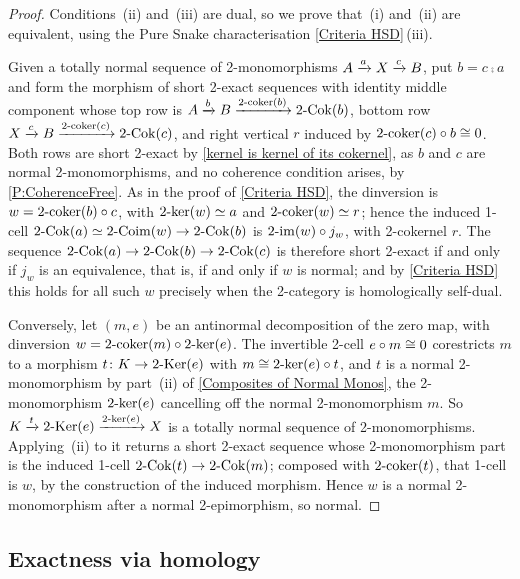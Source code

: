 \begin{proof}
  \leanok
  Conditions~(ii) and~(iii) are dual, so we prove that~(i) and~(ii) are equivalent, using the Pure Snake characterisation \prox\ref{Criteria HSD}\,\textup{(iii)}.

	Given a totally normal sequence of 2-monomorphisms \(A\xrightarrow[]{a}X\xrightarrow[]{c}B\), put \(b=c\comp a\) and form the morphism of short 2-exact sequences with identity middle component whose top row is \(A\xrightarrow[]{b}B\xrightarrow[]{2\text{-}\mathrm{coker}(b)}2\text{-}\mathrm{Cok}(b)\), bottom row \(X\xrightarrow[]{c}B\xrightarrow[]{2\text{-}\mathrm{coker}(c)}2\text{-}\mathrm{Cok}(c)\), and right vertical \(r\) induced by \(2\text{-}\mathrm{coker}(c)\circ b\cong 0\). Both rows are short 2-exact by \prox\ref{kernel is kernel of its cokernel}, as \(b\) and \(c\) are normal 2-monomorphisms, and no coherence condition arises, by \prox\ref{P:CoherenceFree}. As in the proof of \prox\ref{Criteria HSD}, the dinversion is \(w=2\text{-}\mathrm{coker}(b)\circ c\), with \(2\text{-}\mathrm{ker}(w)\simeq a\) and \(2\text{-}\mathrm{coker}(w)\simeq r\); hence the induced 1-cell \(2\text{-}\mathrm{Cok}(a)\simeq2\text{-}\mathrm{Coim}(w)\to2\text{-}\mathrm{Cok}(b)\) is \(2\text{-}\mathrm{im}(w)\circ j_w\), with 2-cokernel \(r\). The sequence \(2\text{-}\mathrm{Cok}(a)\to2\text{-}\mathrm{Cok}(b)\to2\text{-}\mathrm{Cok}(c)\) is therefore short 2-exact if and only if \(j_w\) is an equivalence, that is, if and only if \(w\) is normal; and by \prox\ref{Criteria HSD} this holds for all such \(w\) precisely when the 2-category is homologically self-dual.

	Conversely, let \((m,e)\) be an antinormal decomposition of the zero map, with dinversion \(w=2\text{-}\mathrm{coker}(m)\circ2\text{-}\mathrm{ker}(e)\). The invertible 2-cell \(e\circ m\cong 0\) corestricts \(m\) to a morphism \(t\colon K\to2\text{-}\mathrm{Ker}(e)\) with \(m\cong2\text{-}\mathrm{ker}(e)\circ t\), and \(t\) is a normal 2-monomorphism by part~\textup{(ii)} of \prox\ref{Composites of Normal Monos}, the 2-monomorphism \(2\text{-}\mathrm{ker}(e)\) cancelling off the normal 2-monomorphism \(m\). So \(K\xrightarrow[]{t}2\text{-}\mathrm{Ker}(e)\xrightarrow[]{2\text{-}\mathrm{ker}(e)}X\) is a totally normal sequence of 2-monomorphisms. Applying~(ii) to it returns a short 2-exact sequence whose 2-monomorphism part is the induced 1-cell \(2\text{-}\mathrm{Cok}(t)\to2\text{-}\mathrm{Cok}(m)\); composed with \(2\text{-}\mathrm{coker}(t)\), that 1-cell is \(w\), by the construction of the induced morphism. Hence \(w\) is a normal 2-monomorphism after a normal 2-epimorphism, so normal.
\end{proof}

\subsection{Exactness via homology}\label{SS:ExactnessHomology}

